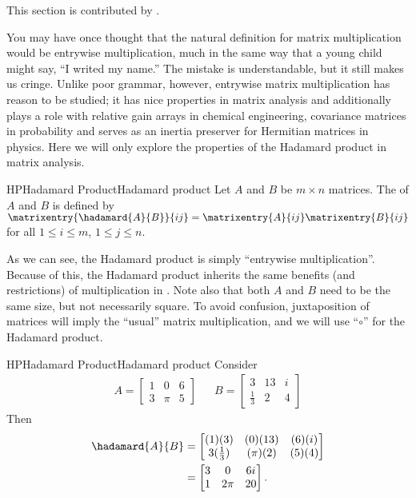 %
%
This section is contributed by \elizabethmillion.\par
%
You may have once thought that the natural definition for matrix multiplication would be entrywise multiplication, much in the same way that a young child might say, ``I writed my name.'' The mistake is understandable, but it still makes us cringe. Unlike poor grammar, however, entrywise matrix multiplication has reason to be studied; it has nice properties in matrix analysis and additionally plays a role with relative gain arrays in chemical engineering, covariance matrices in probability and serves as an inertia preserver for Hermitian matrices in physics. Here we will only explore the properties of the Hadamard product in matrix analysis.
%
\begin{definition}{HP}{Hadamard Product}{Hadamard product}
Let $A$ and $B$ be $m \times n$ matrices. The  of $A$ and $B$ is defined by $\matrixentry{\hadamard{A}{B}}{ij} = \matrixentry{A}{ij} \matrixentry{B}{ij}$ for all $1 \leq i \leq m$, $1 \leq j \leq n$.
%
\end{definition}
%
As we can see, the Hadamard product is simply ``entrywise multiplication''. Because of this, the Hadamard product inherits the same benefits (and restrictions) of multiplication in \complexes. Note also that both $A$ and $B$ need to be the same size, but not necessarily square. To avoid confusion, juxtaposition of matrices will imply the ``usual'' matrix multiplication, and we will use ``$\circ$'' for the Hadamard product.
%
\begin{example}{HP}{Hadamard Product}{Hadamard product}
%
Consider
%
\begin{align*}
A=
\begin{bmatrix}
1 & 0 & 6 \\
3 & \pi & 5
\end{bmatrix}
&&
B=
\begin{bmatrix}
3 & 13 & i \\
\frac{1}{3} & 2 & 4
\end{bmatrix}
\end{align*}
%
Then
%
\begin{align*}
\hadamard{A}{B}
&=
\begin{bmatrix}
(1)(3) & (0)(13) & (6)(i) \\
3(\frac{1}{3}) & (\pi)(2) & (5)(4)
\end{bmatrix} \\
%
&=
\begin{bmatrix}
3 & 0 & 6 i \\
1 & 2 \pi & 20
\end{bmatrix}.
\end{align*}
%
\end{example}
